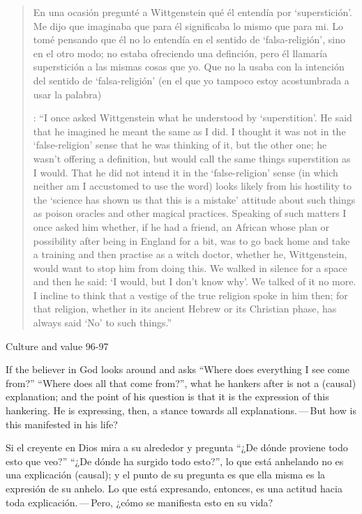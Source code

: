 \blockquote[{\cite[57--58]{anscombe2008faith:paganism}}: \enquote{I once asked Wittgenstein what he understood by ‘superstition’. He said that he imagined he meant the same as I did. I thought it was not in the ‘false-religion’ sense that he was thinking of it, but the other one; he wasn’t offering a definition, but would call the same things superstition as I would. That he did not intend it in the ‘false-religion’ sense (in which neither am I accustomed to use the word) looks likely from his hostility to the ‘science has shown us that this is a mistake’ attitude about such things as poison oracles and other magical practices. Speaking of such matters I once asked him whether, if he had a friend, an African whose plan or possibility after being in England for a bit, was to go back home and take a training and then practise as a witch doctor, whether he, Wittgenstein, would want to stop him from doing this. We walked in silence for a space and then he said: ‘I would, but I don’t know why’. We talked of it no more. I incline to think that a vestige of the true religion spoke in him then; for that religion, whether in its ancient Hebrew or its Christian phase, has always said ‘No’ to such things.}]{En una ocasión pregunté a Wittgenstein qué él entendía por `superstición'. Me dijo que imaginaba que para él significaba lo mismo que para mi. Lo tomé pensando que él no lo entendía en el sentido de `falsa-religión', sino en el otro modo; no estaba ofreciendo una definción, pero él llamaría superstición a las mismas cosas que yo. Que no la usaba con la intención del sentido de `falsa-religión' (en el que yo tampoco estoy acostumbrada a usar la palabra)}

Culture and value 96-97

If the believer in God looks around and asks ``Where does everything I see come from?'' ``Where does all that come from?'', what he hankers after is not a (causal) explanation; and the point of his question is that it is the expression of this hankering. He is expressing, then, a stance towards all explanations.\,---\,But how is this manifested in his life?

Si el creyente en Dios mira a su alrededor y pregunta ``¿De dónde proviene todo esto que veo?'' ``¿De dónde ha surgido todo esto?'', lo que está anhelando no es una explicación (causal); y el punto de su pregunta es que ella misma es la expresión de su anhelo. Lo que está expresando, entonces, es una actitud hacia toda explicación.\,---\,Pero, ¿cómo se manifiesta esto en su vida?

